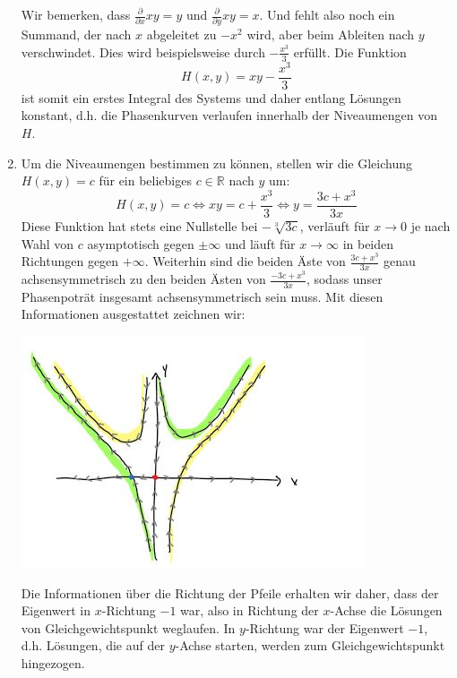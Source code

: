 \documentclass[a4paper]{article}
\begin{document}
\begin{enumerate}
    Wir bemerken, dass $\frac{\partial}{\partial x} xy = y$ und $\frac{\partial}{\partial y} xy = x$.
    Und fehlt also noch ein Summand, der nach $x$ abgeleitet zu $-x^2$ wird, aber beim Ableiten nach $y$ verschwindet.
    Dies wird beispielsweise durch $-\frac{x^3}{3}$ erfüllt.
    Die Funktion
    \begin{equation*}
        H(x,y) = xy - \frac{x^3}{3}
    \end{equation*}
    ist somit ein erstes Integral des Systems und daher entlang Lösungen konstant, d.h. die Phasenkurven verlaufen innerhalb der Niveaumengen von $H$.
    \item Um die Niveaumengen bestimmen zu können, stellen wir die Gleichung $H(x,y) = c$ für ein beliebiges $c \in \mathds{R}$ nach $y$ um:
    \begin{equation*}
        H(x,y) = c \iff xy = c + \frac{x^3}{3} \iff y = \frac{3c + x^3}{3x}
    \end{equation*} 
    Diese Funktion hat stets eine Nullstelle bei $-\sqrt[3]{3c}$, verläuft für $x \to 0$ je nach Wahl von $c$ asymptotisch gegen $\pm \infty$ und läuft für $x \to \infty$ in beiden Richtungen gegen $+\infty$.
    Weiterhin sind die beiden Äste von $\frac{3c + x^3}{3x}$ genau achsensymmetrisch zu den beiden Ästen von $\frac{-3c +x^3}{3x}$, sodass unser Phasenpoträt insgesamt achsensymmetrisch sein muss.
    Mit diesen Informationen ausgestattet zeichnen wir:

    \begin{center}
        \includegraphics[width=0.8\textwidth]{phasenpotrait.jpeg}
    \end{center}


    Die Informationen über die Richtung der Pfeile erhalten wir daher, dass der Eigenwert in $x$-Richtung $-1$ war, also in Richtung der $x$-Achse die Lösungen von Gleichgewichtspunkt weglaufen. In $y$-Richtung war der Eigenwert $-1$, d.h. Lösungen, die auf der $y$-Achse starten, werden zum Gleichgewichtspunkt hingezogen.
\end{enumerate}
\end{document}
